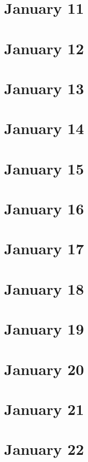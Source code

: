 \section{January 11}

\section{January 12}

\section{January 13}

\section{January 14}

\section{January 15}

\section{January 16}

\section{January 17}

\section{January 18}

\section{January 19}

\section{January 20}

\section{January 21}

\section{January 22}

